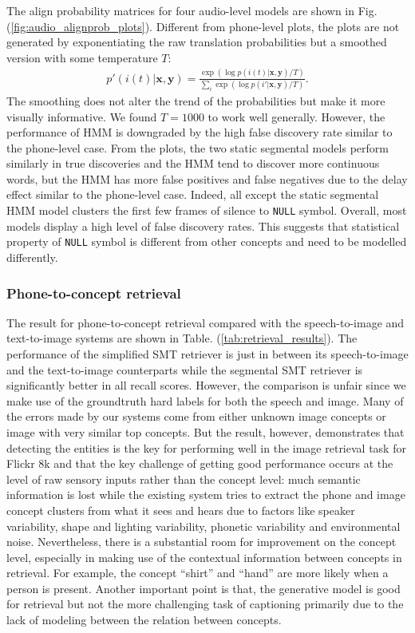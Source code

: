 \documentclass[journal]{IEEEtran}
\begin{document}
The align probability matrices for four audio-level models are shown in Fig. (\ref{fig:audio_alignprob_plots}). Different from phone-level plots, the plots are not generated by exponentiating the raw translation probabilities but a smoothed version with some temperature $T$:
\begin{align*}
    p'(i(t)|\mathbf x, \mathbf y) = \frac{\exp(\log p(i(t)|\mathbf x, \mathbf y)/T)}{\sum_i \exp(\log p(i'|\mathbf x, \mathbf y)/T)}.
\end{align*}
The smoothing does not alter the trend of the probabilities but make it more visually informative. We found $T=1000$ to work well generally. However, the performance of HMM is downgraded by the high false discovery rate similar to the phone-level case. From the plots, the two static segmental models perform similarly in true discoveries and the HMM tend to discover more continuous words, but the HMM has more false positives and false negatives due to the delay effect similar to the phone-level case. Indeed, all except the static segmental HMM model clusters the first few frames of silence to \texttt{NULL} symbol. Overall, most models display a high level of false discovery rates. This suggests that statistical property of \texttt{NULL} symbol is different from other concepts and need to be modelled differently.  



\subsubsection{Phone-to-concept retrieval}
The result for phone-to-concept retrieval compared with the speech-to-image and text-to-image systems are shown in Table. (\ref{tab:retrieval_results}). The performance of the simplified SMT retriever is just in between its speech-to-image and the text-to-image counterparts while the segmental SMT retriever is significantly better in all recall scores. However, the comparison is unfair since we make use of the groundtruth hard labels for both the speech and image. Many of the errors made by our systems come from either unknown image concepts or image with very similar top concepts. But the result, however, demonstrates that detecting the entities is the key for performing well in the image retrieval task for Flickr 8k and that the key challenge of getting good performance occurs at the level of raw sensory inputs rather than the concept level: much semantic information is lost while the existing system tries to extract the phone  and image concept clusters from what it sees and hears due to factors like speaker variability, shape and lighting variability, phonetic variability and environmental noise. Nevertheless, there is a substantial room for improvement on the concept level, especially in making use of the contextual information between concepts in retrieval. For example, the concept ``shirt'' and ``hand'' are more likely when a person is present. Another important point is that, the generative model is good for retrieval but not the more challenging task of captioning primarily due to the lack of modeling between the relation between concepts.  
\end{document}
